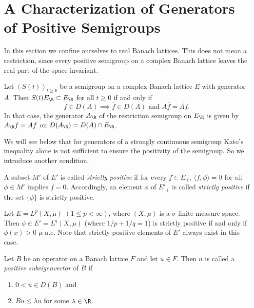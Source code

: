 \section{A Characterization of Generators of Positive Semigroups}\label{sec:c2-3}%
%
In this section we confine ourselves to real Banach lattices.
This does not mean a restriction, since every positive semigroup on a complex Banach lattice leaves the real part of the space invariant.
\begin{remark}\label{rem:c2-3.1}
%
Let $(S(t))_{t \geq 0}$ be a semigroup on a complex Banach lattice $E$ with generator $A$.
Then $S(t)E_{\R} \subset E_{\R}$ for all $t \geq 0$ if and only if
\begin{equation}\label{eq:c2-3.1}
f \in D(A) \implies \bar{f} \in D(A) \text{ and } A\bar{f} = \overline{Af}.
\end{equation}
In that case, the generator $A_{\R}$ of the restriction semigroup on $E_{\R}$ is given by\\  $A_{\R}f = Af$ on $D(A_{\R}) = D(A) \cap E_{\R}$.
\end{remark}
We will see below that for generators of a strongly continuous semigroup Kato's inequality alone is not sufficient to ensure the positivity of the semigroup.
So we introduce another condition.
\begin{definition}\label{def:c2-3.2}
%
A subset $M'$ of\/ $E'$ is called \emph{strictly positive} if for every $f \in E_{+}$, $\langle f,\phi \rangle = 0$ for all $\phi \in M'$ implies $f = 0$.
Accordingly, an element $\phi$ of\/ $E'_{+}$ is called \emph{strictly positive} if the set $\{\phi\}$ is strictly positive.
\end{definition}
\begin{example}\label{ex:c2-3.3}
%
Let $E = L^p(X,\mu)$ $(1 \leq p < \infty)$, where $(X,\mu)$ is a $\sigma$-finite measure space.
Then $\phi \in E'
= L^q(X,\mu)$ (where $1/p + 1/q = 1$) is strictly positive if and only if\/ $\phi(x) > 0$ $\mu$-a.e.
Note that strictly positive elements of\/ $E'$ always exist in this case.
\end{example}
\begin{definition}\label{def:c2-3.4}
%
Let $B$ be an operator on a Banach lattice $F$ and let $u \in F$.
Then $u$ is called a \emph{positive subeigenvector} of\/ $B$ if
\begin{enumerate}[\upshape (i)]
\item \label{def:c2-3.4-1}
$0 < u \in D(B)$ and
\item \label{def:c2-3.4-2}
$Bu \leq \lambda u$ for some $\lambda \in \R$.
\end{enumerate}
\end{definition}
